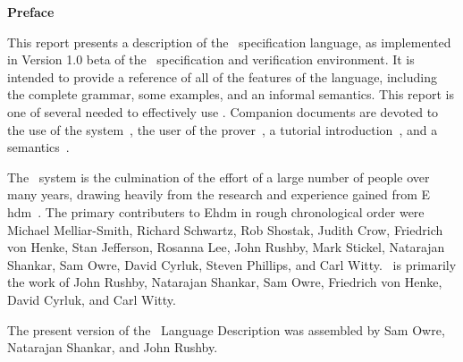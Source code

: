 \vspace{4in}
{\Huge\bf Preface}\linebreak
\vspace{.75in}


This report presents a description of the \pvs\ specification language,
as implemented in Version 1.0 beta of the \pvs\ specification and
verification environment.  It is intended to provide a reference of all
of the features of the language, including the complete grammar, some
examples, and an informal semantics. This report is one of several
needed to effectively use \pvs.  Companion documents are devoted to the
use of the system~\cite{PVS:userguide}, the user of the
prover~\cite{PVS:prover}, a tutorial introduction~\cite{PVS:tutorial},
and a semantics~\cite{PVS:semantics}.


The \pvs\ system is the culmination of the effort of a large number of
people over many years, drawing heavily from the research and experience
gained from E{\sc
hdm}~\cite{EHDM:Userguide,EHDM:Language,EHDM:semantics,EHDM:supplement,EHDM:tutorial}.
The primary contributers to E{\sc hdm} in rough chronological order
were Michael Melliar-Smith, Richard Schwartz, Rob Shostak, Judith Crow,
Friedrich von Henke, Stan Jefferson, Rosanna Lee, John Rushby, Mark
Stickel, Natarajan Shankar, Sam Owre, David Cyrluk, Steven Phillips,
and Carl Witty.
\pvs\ is primarily the work of John Rushby, Natarajan Shankar, Sam Owre,
Friedrich von Henke, David Cyrluk, and Carl Witty.

The present version of the \pvs\ Language Description was assembled by
Sam Owre, Natarajan Shankar, and John Rushby.



